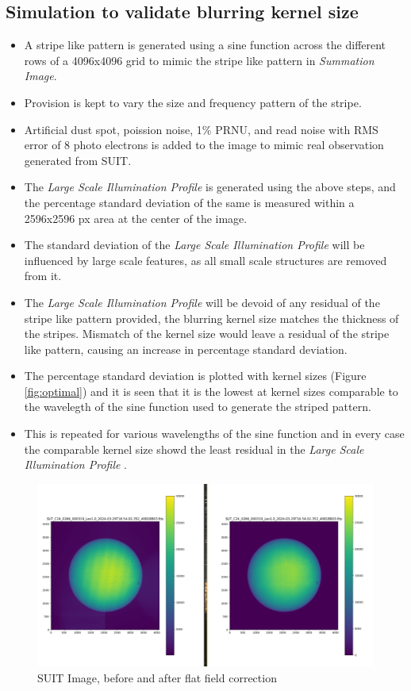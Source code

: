 \documentclass[11pt,a4paper]{article}
\begin{document}
	\subsection{Simulation to validate blurring kernel size}
	\begin{itemize}
		\item A stripe like pattern is generated using a sine function across the different rows of a 4096x4096 grid to mimic the stripe like pattern in \textit{Summation Image}.
		\item Provision is kept to vary the size and frequency pattern of the stripe.
		\item Artificial dust spot, poission noise, 1\% PRNU, and read noise with RMS error of 8 photo electrons is added to the image to mimic real observation generated from SUIT.
		\item The \textit{Large Scale Illumination Profile} is generated using the above steps, and the percentage standard deviation of the same is measured within a 2596x2596 px area at the center of the image.
		\item The standard deviation of the \textit{Large Scale Illumination Profile} will be influenced by large scale features, as all small scale structures are removed from it.
		\item The \textit{Large Scale Illumination Profile} will be devoid of any residual of the stripe like pattern provided, the blurring kernel size matches the thickness of the stripes. Mismatch of the kernel size would leave a residual of the stripe like pattern, causing an increase in percentage standard deviation.
		\item The percentage standard deviation is plotted with kernel sizes (Figure \ref{fig:optimal}) and it is seen that it is the lowest at kernel sizes comparable to the wavelegth of the sine function used to generate the striped pattern.
		\item This is repeated for various wavelengths of the sine function and in every case the comparable kernel size showd the least residual in the \textit{Large Scale Illumination Profile} .
	\end{itemize}
	
	\begin{figure}
		\centering
		\includegraphics[width=0.7\linewidth]{pics/screenshot_2024-06-06_12-24-27}
		\caption{SUIT Image, before and after flat field correction}
		\label{fig:compare}
	\end{figure}
	
\end{document}
